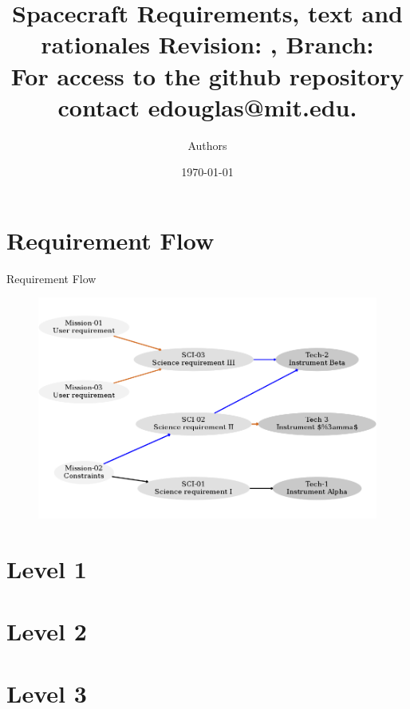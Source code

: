 \documentclass[9pt]{beamer}
\title{ Spacecraft Requirements, text and rationales
  \tiny{Revision: \gitDescribe, Branch: \gitBranch\\
    For access to the github repository contact edouglas@mit.edu.}}
\author{Authors}
\date{\today}
\begin{document}




\frame{\titlepage}

\section[Outline]{}


\section{Requirement Flow}
\begin{frame}[shrink]{Requirement Flow}
\begin{figure}[htbp]
\begin{center}
\includegraphics[width=\textwidth]{Digraph_gv.png}
\label{default}
\end{center}
\end{figure}
\end{frame}

\section{Level 1}

\section{Level 2}

\section{Level 3}

\end{document}
